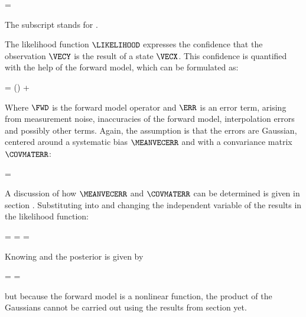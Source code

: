     \startformula
        \PRIOR = \GAUSS{\VECX}{\MEANVECA}{\COVMATA}
    \stopformula

    The subscript stands for .

    The likelihood function $\LIKELIHOOD$ expresses the confidence that the
    observation $\VECY$ is the result of a state $\VECX$. This confidence is
    quantified with the help of the forward model, which can be formulated as:

    \startformula
        \VECY = \FWD(\VECX) + \ERR
    \stopformula

    Where $\FWD$ is the forward model operator and $\ERR$ is an error term,
    arising from measurement noise, inaccuracies of the forward model,
    interpolation errors and possibly other terms. Again, the assumption is
    that the errors are Gaussian, centered around a systematic bias
    $\MEANVECERR$ and with a convariance matrix $\COVMATERR$:

    \startformula
        \PROB{\ERR} = \GAUSS{\ERR}{\MEANVECERR}{\COVMATERR}
    \stopformula

    A discussion of how $\MEANVECERR$ and $\COVMATERR$ can be determined is
    given in section . Substituting 
    into  and changing the independent variable of
    the {\PDF} results in the likelihood function:
    
    \placesubformula
    \startformula
    \startalign[n=3,align={right,middle,left}]
        \NC \PROB{\VECY - \FWD(\VECX)} = \NC
            \GAUSS{\VECY - \FWD(\VECX)}{\MEANVECERR}{\COVMATERR} \NC \NR
        \NC = \NC \GAUSS{\VECY}{\FWD(\VECX)+\MEANVECERR}{\COVMATERR} \NC
            = \LIKELIHOOD {}
    \stopalign
    \stopformula

    Knowing  and  the
    posterior {\PDF} is given by

    \startformula
        \POSTERIOR
        = \frac{\LIKELIHOOD \PRIOR}{\NORMALIZATION}
        = \frac{\GAUSS{\VECY}{\FWD(\VECX) + \MEANVECERR}{\COVMATERR}
            ~\GAUSS{\VECX}{\MEANVECA}{\COVMATA}}{\NORMALIZATION} \EQCOMMA
    \stopformula

    but because the forward model is a nonlinear function, the product of the
    Gaussians cannot be carried out using the results from section
     yet.

